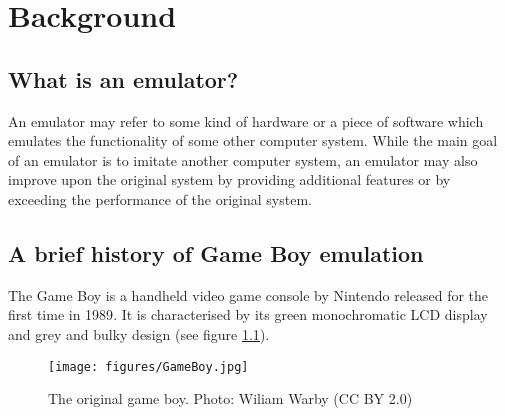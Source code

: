 \chapter{Background}



\section{What is an emulator?}
An emulator may refer to some kind of hardware or a piece of software which emulates the functionality of some other computer system\cite{emulatortechnopedia}\cite{emulatorlifewire}. While the main goal of an emulator is to imitate another computer system, an emulator may also improve upon the original system by providing additional features or by exceeding the performance of the original system\cite{emulatorlifewire}.

\section{A brief history of Game Boy emulation}
The Game Boy is a handheld video game console by Nintendo released for the first time in 1989\cite{gameboy}. It is characterised by its green monochromatic LCD display and grey and bulky design (see figure \ref{fig:GameBoy-fig})\cite{gameboylook}. 

\begin{figure}[H]
    \centering
    \texttt{[image: figures/GameBoy.jpg]}
    \caption{The original game boy. Photo: Wiliam Warby (CC BY 2.0)}
    \label{fig:GameBoy-fig}
\end{figure}

